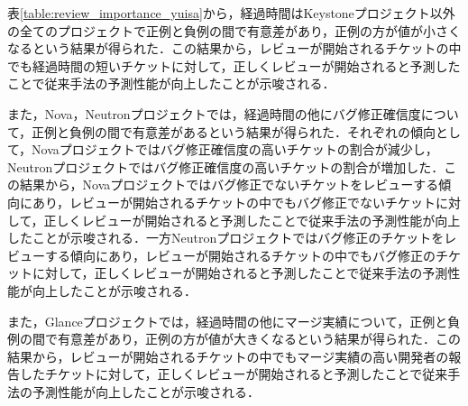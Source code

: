 \documentclass[submit]{ipsj}
\begin{document}
表\ref{table:review_importance_yuisa}から，経過時間はKeystoneプロジェクト以外の全てのプロジェクトで正例と負例の間で有意差があり，正例の方が値が小さくなるという結果が得られた．この結果から，レビューが開始されるチケットの中でも経過時間の短いチケットに対して，正しくレビューが開始されると予測したことで従来手法の予測性能が向上したことが示唆される．

また，Nova，Neutronプロジェクトでは，経過時間の他にバグ修正確信度について，正例と負例の間で有意差があるという結果が得られた．それぞれの傾向として，Novaプロジェクトではバグ修正確信度の高いチケットの割合が減少し，Neutronプロジェクトではバグ修正確信度の高いチケットの割合が増加した．この結果から，Novaプロジェクトではバグ修正でないチケットをレビューする傾向にあり，レビューが開始されるチケットの中でもバグ修正でないチケットに対して，正しくレビューが開始されると予測したことで従来手法の予測性能が向上したことが示唆される．一方Neutronプロジェクトではバグ修正のチケットをレビューする傾向にあり，レビューが開始されるチケットの中でもバグ修正のチケットに対して，正しくレビューが開始されると予測したことで従来手法の予測性能が向上したことが示唆される．

また，Glanceプロジェクトでは，経過時間の他にマージ実績について，正例と負例の間で有意差があり，正例の方が値が大きくなるという結果が得られた．この結果から，レビューが開始されるチケットの中でもマージ実績の高い開発者の報告したチケットに対して，正しくレビューが開始されると予測したことで従来手法の予測性能が向上したことが示唆される．

\end{document}
